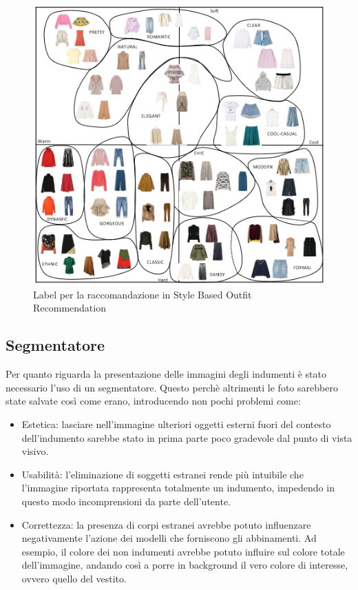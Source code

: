 \begin{figure}[tbp]
	\includegraphics{img/styles}
	\caption{Label per la raccomandazione in Style Based Outfit Recommendation} \label{figura:stili} 
\end{figure}

\subsection{Segmentatore}

Per quanto riguarda la presentazione delle immagini degli indumenti è stato necessario l'uso di un segmentatore. Questo perchè altrimenti le foto sarebbero state salvate così come erano, introducendo non pochi problemi come:
\begin{itemize}
\item Estetica: lasciare nell'immagine ulteriori oggetti esterni fuori del contesto dell'indumento sarebbe stato in prima parte poco gradevole dal punto di vista visivo. 
\item Usabilità: l'eliminazione di soggetti estranei rende più intuibile che l'immagine riportata rappresenta totalmente un indumento, impedendo in questo modo incomprensioni da parte dell'utente.
\item Correttezza: la presenza di corpi estranei avrebbe potuto influenzare negativamente l'azione dei modelli che forniscono gli abbinamenti. Ad esempio, il colore dei non indumenti avrebbe potuto influire sul colore totale dell'immagine, andando così a porre in background il vero colore di interesse, ovvero quello del vestito.
\end{itemize}

